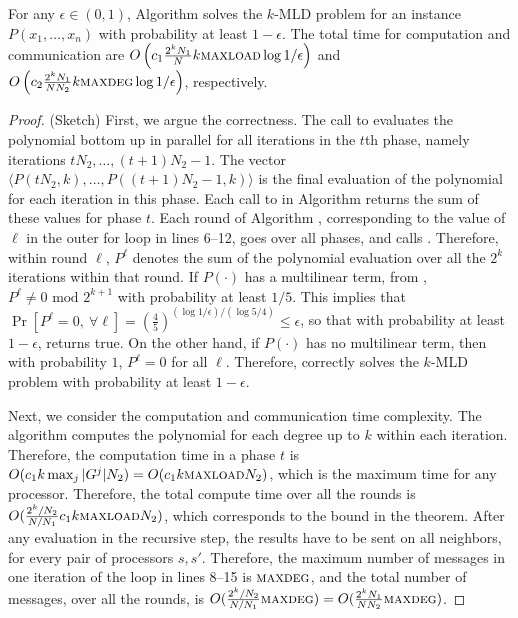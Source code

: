 \begin{theorem}
\label{thm:parmaxwt}
For any $\epsilon\in(0, 1)$,
Algorithm \parmaxwt{} solves the \textsc{$k$-MLD} problem for an
instance $P(x_1,\ldots,x_n)$ with probability at least $1-\epsilon$. The total time for
computation and communication are $O\left(c_1\frac{2^kN_1}{N}k \textsc{maxload}{}\log{1/\epsilon}\right)$ 
and $O\left(c_2\frac{2^kN_1}{N N_2}k \textsc{maxdeg}{}\log{1/\epsilon}\right)$, respectively.
\end{theorem}
\begin{proof} (Sketch)
First, we argue the correctness. 
The call to \parcircuit{} evaluates the polynomial bottom up in parallel for all iterations in the
$t$th phase, namely iterations $tN_2,\ldots,(t+1)N_2-1$. The vector
$\langle P(tN_2, k),  \ldots ,P((t+1)N_2-1, k)\rangle$
is the final evaluation of the polynomial for each iteration in this phase.
Each call to \parcircuit{} in Algorithm \parmaxwt{}
returns the sum of these values for phase $t$.
Each round of Algorithm \parmaxwt{}, corresponding to the value of
$\ell$ in the outer for loop in lines 6--12, goes over all phases, and
calls \parcircuit{}. Therefore, within round $\ell$, $P^{\ell}$ denotes the
sum of the polynomial evaluation over all the $2^k$ iterations within that round.
If $P(\cdot)$ has a multilinear term,
from \cite{koutis:icalp08,williams2009finding}, $P^{\ell}\neq 0 \text{ mod }2^{k+1}$ with
probability at least $1/5$. This implies that 
$\Pr[P^{\ell} = 0,\ \forall \ell] = (\frac{4}{5})^{(\log{1/\epsilon})/(\log{5/4})}\leq\epsilon$,
so that with probability at least $1-\epsilon$, \parmaxwt{} returns true.  On the other hand,
if $P(\cdot)$ has no multilinear term, then with probability $1$, $P^{\ell}=0$ for all $\ell$.
Therefore, \parmaxwt{} correctly solves the \textsc{$k$-MLD} problem with probability
at least $1-\epsilon$.

Next, we consider the computation and communication time complexity. 
The algorithm \parcircuit{} computes the polynomial for each degree up to $k$ within each iteration.
Therefore, the computation time in a phase $t$ is 
$O(c_1 k \max_j |G^j| N_2) = O(c_1k\textsc{maxload}{}N_2)$, which is the maximum time for any processor. Therefore, the total compute time over all the rounds is
$O(\frac{2^k/N_2}{N/N_1} c_1 k \textsc{maxload}{} N_2)$, which corresponds to the bound in the theorem.
After any evaluation in the recursive step, the results have to be sent on all neighbors, for every pair of
processors $s, s'$. Therefore, the maximum number of messages in one iteration of the loop in lines 8--15 is $\textsc{maxdeg}{}$, and the total number of messages, over all the rounds, is
$O(\frac{2^k/N_2}{N/N_1} \textsc{maxdeg}{}) = O(\frac{2^kN_1}{N N_2} \textsc{maxdeg}{})$.
\end{proof}

